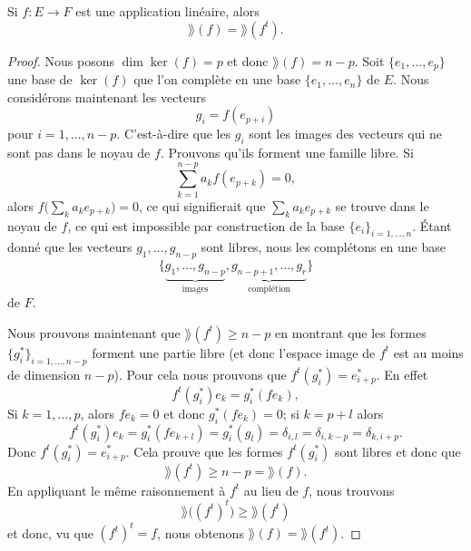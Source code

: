 \begin{lemma}   \label{LemSEpTcW}
    Si \( f\colon E\to F\) est une application linéaire, alors
    \begin{equation}
        \rang(f)=\rang(f^t).
    \end{equation}
\end{lemma}

\begin{proof}
    Nous posons \( \dim\ker(f)=p\) et donc \( \rang(f)=n-p\). Soit \( \{ e_1,\ldots, e_p \}\) une base de \( \ker(f)\) que l'on complète en une base \( \{ e_1,\ldots, e_n \}\) de \( E\). Nous considérons maintenant les vecteurs
    \begin{equation}
        g_i=f(e_{p+i})
    \end{equation}
    pour \( i=1,\ldots, n-p\). C'est-à-dire que les \( g_i\) sont les images des vecteurs qui ne sont pas dans le noyau de \( f\). Prouvons qu'ils forment une famille libre. Si
    \begin{equation}
        \sum_{k=1}^{n-p}a_kf(e_{p+k})=0,
    \end{equation}
    alors \( f\big( \sum_ka_ke_{p+k} \big)=0\), ce qui signifierait que \( \sum_ka_ke_{p+k}\) se trouve dans le noyau de \( f\), ce qui est impossible par construction de la base \( \{ e_i \}_{i=1,\ldots, n}\). Étant donné que les vecteurs \( g_1,\ldots, g_{n-p}\) sont libres, nous les complétons en une base
    \begin{equation}
        \{ \underbrace{g_1,\ldots, g_{n-p}}_{\text{images}},\underbrace{g_{n-p+1},\ldots, g_r}_{\text{complétion}} \}
    \end{equation}
    de \( F\).

    Nous prouvons maintenant que \( \rang(f^t)\geq n-p\) en montrant que les formes \( \{ g_i^* \}_{i=1,\ldots, n-p}\) forment une partie libre (et donc l'espace image de \( f^t\) est au moins de dimension \( n-p\)). Pour cela nous prouvons que \( f^t(g_i^*)=e^*_{i+p}\). En effet
    \begin{equation}
        f^t(g^*_i)e_k=g_i^*(fe_k),
    \end{equation}
    Si \( k=1,\ldots, p\), alors \( fe_k=0\) et donc \( g_i^*(fe_k)=0\); si \( k=p+l\) alors
    \begin{equation}
        f^t(g_i^*)e_k=g_i^*(fe_{k+l})=g^*_i(g_l)=\delta_{i,l}=\delta_{i,k-p}=\delta_{k,i+p}.
    \end{equation}
    Donc \( f^t(g_i^*)=e^*_{i+p}\). Cela prouve que les formes \( f^t(g_i^*)\) sont libres et donc que
    \begin{equation}
        \rang(f^t)\geq n-p=\rang(f).
    \end{equation}
    En appliquant le même raisonnement à \( f^t\) au lieu de \( f\), nous trouvons
    \begin{equation}
        \rang\big( (f^t)^t \big)\geq \rang(f^t)
    \end{equation}
    et donc, vu que \( (f^t)^t=f\), nous obtenons \( \rang(f)=\rang(f^t)\).

\end{proof}

